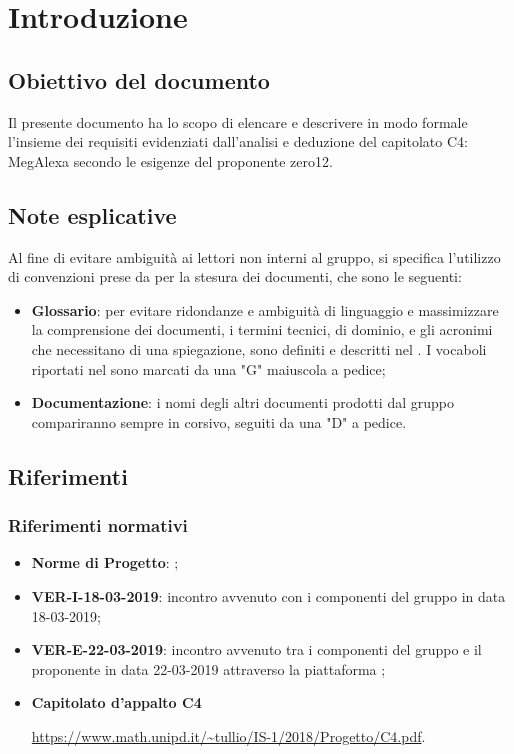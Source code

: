 \justify \section{Introduzione}

\subsection{Obiettivo del documento}
Il presente documento ha lo scopo di elencare e descrivere in modo formale l'insieme dei requisiti evidenziati dall'analisi e deduzione del capitolato C4: MegAlexa secondo le esigenze del proponente zero12.


\subsection{Note esplicative}
Al fine di evitare ambiguità ai lettori non interni al gruppo, si specifica l'utilizzo di convenzioni prese da \groupName{} per la stesura dei documenti, che sono le seguenti: 
\begin{itemize}
\item \textbf{Glossario}: per evitare ridondanze e ambiguità di linguaggio e massimizzare la comprensione dei documenti, i termini tecnici, di dominio, e gli acronimi  che necessitano di una spiegazione, sono  definiti e descritti nel \docNameVersionGlo{}. I vocaboli riportati nel \docNameVersionGlo{} sono marcati da una "G" maiuscola a pedice;
\item \textbf{Documentazione}: i nomi degli altri documenti prodotti dal gruppo \groupName{} compariranno sempre in corsivo, seguiti da una "D" a pedice.
\end{itemize}

\subsection{Riferimenti}
\subsubsection{Riferimenti normativi}
\begin{itemize}
\item \textbf{Norme di Progetto}: \docNameVersionNdP;
\item \textbf{VER-I-18-03-2019}: incontro avvenuto con i componenti del gruppo in data 18-03-2019;
\item \textbf{VER-E-22-03-2019}: incontro avvenuto tra i componenti del gruppo e il proponente \proposerName{} in data 22-03-2019 attraverso la piattaforma ;
\item \textbf{Capitolato d'appalto C4}

\url{https://www.math.unipd.it/~tullio/IS-1/2018/Progetto/C4.pdf}.
\end{itemize}



